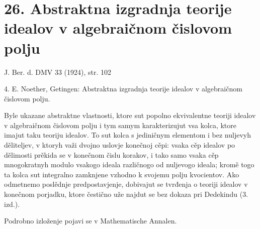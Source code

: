 \documentclass[11pt]{article}
\begin{document}
\section*{26. Abstraktna izgradnja teorije idealov v algebraičnom čislovom polju}

\begin{center}
J. Ber. d. DMV 33 (1924), str. 102
\end{center}

4. E. Noether, Getingen: Abstraktna izgradnja teorije idealov v algebraičnom čislovom polju.

Byle ukazane abstraktne vlastnosti, ktore sut popolno ekvivalentne teoriji idealov v algebraičnom čislovom polju i tym samym karakterizujut vsa kolca, ktore imajut taku teoriju idealov. To sut kolca s jediničnym elementom i bez nuljevyh děliteljev, v ktoryh važi dvojno uslovje konečnoj cěpi: vsaka cěp idealov po dělimosti prěkida se v konečnom čislu korakov, i tako samo vsaka cěp mnogokratnyh modulo vsakogo ideala različnogo od nuljevogo ideala; kromě togo ta kolca sut integralno zamknjene vzhodno k svojemu polju kvocientov. Ako odmetnemo poslědnje predpostavjenje, dobivajut se tvrđenja o teoriji idealov v konečnom porjadku, ktore čestično uže najdut se bez dokaza pri Dedekindu (3. izd.).

Podrobno izloženje pojavi se v Mathematische Annalen.
\end{document}
